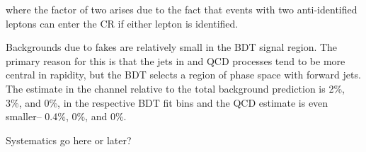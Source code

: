 \noindent
where the factor of two arises due to the fact that events with two
anti-identified leptons can enter the \wjets CR if either lepton is
identified. 

Backgrounds due to fakes are relatively small in the BDT signal
region. The primary reason for this is that the jets in \wjets and QCD
processes tend to be more central in rapidity, but the BDT selects a
region of phase space with forward jets. The \wjets estimate in the
\emme channel relative to the total background prediction is 2\%, 3\%,
and 0\%, in the respective BDT fit bins and the QCD estimate is even
smaller-- 0.4\%, 0\%, and 0\%. 

\noindent Systematics go here or later?

